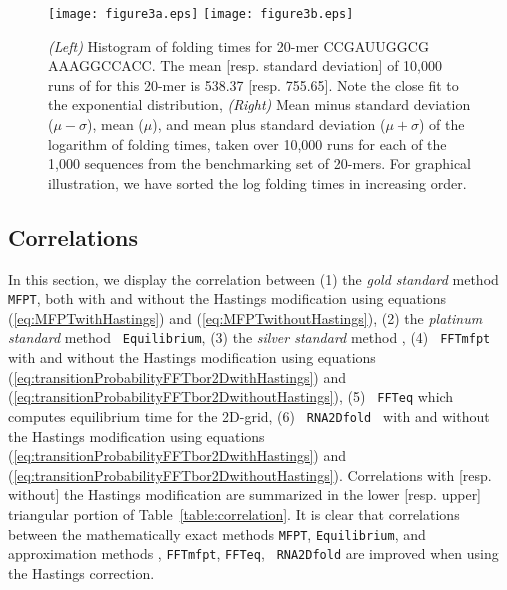 \begin{figure*}
\centering
\texttt{[image: figure3a.eps]}
\texttt{[image: figure3b.eps]}
\caption{{\em (Left)} Histogram of \kinfold folding times for 20-mer CCGAUUGGCG AAAGGCCACC. The mean [resp. standard deviation] of 10,000 runs of \kinfold for this 20-mer is 538.37 [resp. 755.65]. Note the close fit to the exponential distribution, {\em (Right)} Mean minus standard deviation ($\mu -\sigma$), mean ($\mu$), and mean plus standard deviation ($\mu + \sigma$) of the logarithm of \kinfold folding times, taken over 10,000 runs for each of the 1,000 sequences from the benchmarking set of 20-mers. For graphical illustration, we have sorted the log folding times in increasing order. } \label{fig:meanStdevKinfoldRuns1000sequences}
\end{figure*}



\subsection{Correlations}

In this section, we display the correlation between (1) the {\em gold
standard} method {\tt MFPT}, both with and without the Hastings
modification using equations (\ref{eq:MFPTwithHastings}) and
(\ref{eq:MFPTwithoutHastings}), (2) the {\em platinum standard} method {\tt
Equilibrium}, (3) the {\em silver standard} method \kinfold, (4) {\tt
FFTmfpt} with and without the Hastings modification using equations
(\ref{eq:transitionProbabilityFFTbor2DwithHastings}) and
(\ref{eq:transitionProbabilityFFTbor2DwithoutHastings}), (5) {\tt
FFTeq} which computes equilibrium time for the 2D-grid, (6) {\tt
RNA2Dfold } with and without the Hastings modification using equations
(\ref{eq:transitionProbabilityFFTbor2DwithHastings}) and
(\ref{eq:transitionProbabilityFFTbor2DwithoutHastings}). Correlations
with [resp. without] the Hastings modification are summarized in the
lower [resp. upper] triangular portion of
Table~\ref{table:correlation}. It is clear that correlations between
the mathematically exact methods {\tt MFPT}, {\tt Equilibrium}, and
approximation methods \kinfold, {\tt FFTmfpt}, {\tt FFTeq}, {\tt
RNA2Dfold} are improved when using the Hastings correction.

